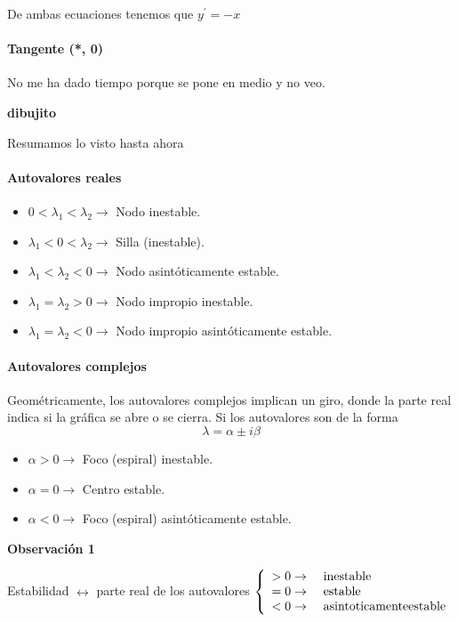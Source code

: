 \begin{example}
De ambas ecuaciones tenemos que $y^\prime = -x$

\paragraph{Tangente (*, 0)}
No me ha dado tiempo porque se pone en medio y no veo.

\textbf{dibujito}

\end{example}

Resumamos lo visto hasta ahora
\paragraph{Autovalores reales}
\begin{itemize}
\item $0< \lambda_1 < \lambda_2 \rightarrow$ Nodo inestable.
\item $\lambda_1 < 0 < \lambda_2 \rightarrow$ Silla (inestable).
\item $\lambda_1 < \lambda_2 < 0 \rightarrow$ Nodo asintóticamente estable.
\item $\lambda_1 = \lambda_2 > 0 \rightarrow$ Nodo impropio inestable.
\item $\lambda_1 = \lambda_2 < 0 \rightarrow$ Nodo impropio asintóticamente estable.
\end{itemize}

\paragraph{Autovalores complejos}
Geométricamente, los autovalores complejos implican un giro, donde la parte real indica si la gráfica se abre o se cierra.
Si los autovalores son de la forma
$$\lambda = \alpha \pm i\beta$$
\begin{itemize}
\item $\alpha > 0 \rightarrow$ Foco (espiral) inestable.
\item $\alpha = 0 \rightarrow$ Centro estable.
\item $\alpha < 0 \rightarrow$ Foco (espiral) asintóticamente estable.
\end{itemize}

\textbf{Observación 1}

Estabilidad $\leftrightarrow$ parte real de los autovalores $
\left\lbrace
\begin{array}{l l}
> 0 \rightarrow &\text{ inestable}\\
= 0 \rightarrow &\text{ estable}\\
< 0 \rightarrow &\text{ asintoticamenteestable}\\
\end{array}
\right.
$

